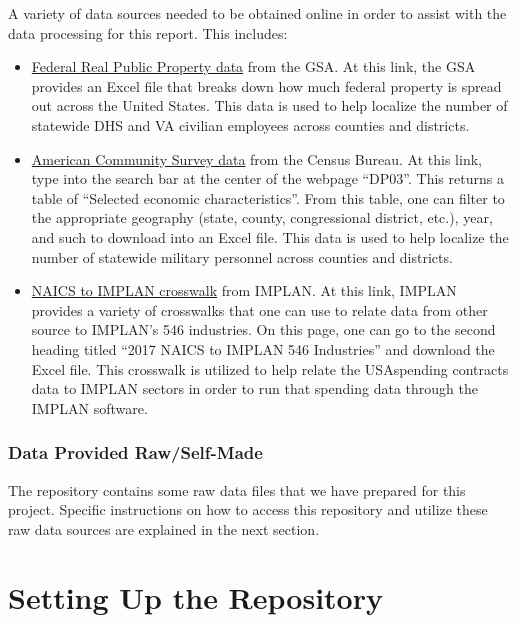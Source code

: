 \documentclass[
]{book}
\begin{document}
A variety of data sources needed to be obtained online in order to assist with the data processing for this report. This includes:

\begin{itemize}
\item
  \href{https://www.gsa.gov/policy-regulations/policy/real-property-policy/asset-management/federal-real-property-profile-frpp/federal-real-property-public-data-set}{Federal Real Public Property data} from the GSA. At this link, the GSA provides an Excel file that breaks down how much federal property is spread out across the United States. This data is used to help localize the number of statewide DHS and VA civilian employees across counties and districts.
\item
  \href{https://data.census.gov/cedsci/}{American Community Survey data} from the Census Bureau. At this link, type into the search bar at the center of the webpage ``DP03''. This returns a table of ``Selected economic characteristics''. From this table, one can filter to the appropriate geography (state, county, congressional district, etc.), year, and such to download into an Excel file. This data is used to help localize the number of statewide military personnel across counties and districts.
\item
  \href{https://support.implan.com/hc/en-us/articles/360034896614-546-Industries-Conversions-Bridges-Construction-2018-Data}{NAICS to IMPLAN crosswalk} from IMPLAN. At this link, IMPLAN provides a variety of crosswalks that one can use to relate data from other source to IMPLAN's 546 industries. On this page, one can go to the second heading titled ``2017 NAICS to IMPLAN 546 Industries'' and download the Excel file. This crosswalk is utilized to help relate the USAspending contracts data to IMPLAN sectors in order to run that spending data through the IMPLAN software.
\end{itemize}

\hypertarget{data-provided-rawself-made}{%
\subsection{Data Provided Raw/Self-Made}\label{data-provided-rawself-made}}

The repository contains some raw data files that we have prepared for this project. Specific instructions on how to access this repository and utilize these raw data sources are explained in the next section.

\hypertarget{setting-up-the-repository}{%
\chapter{Setting Up the Repository}\label{setting-up-the-repository}}
\end{document}
